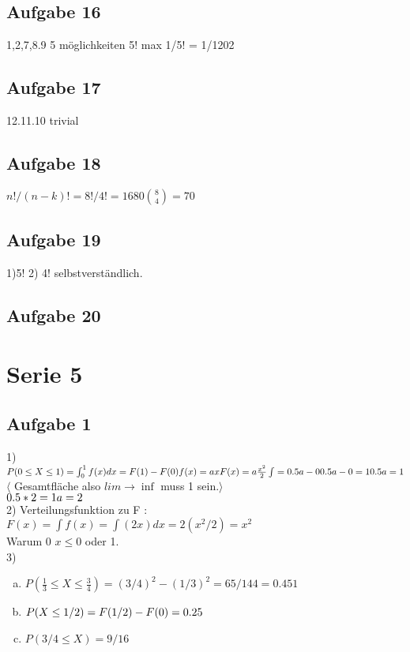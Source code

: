\documentclass[a4paper,10pt]{scrbook}
\begin{document}
\section*{Aufgabe 16} 1,2,7,8.9 5 möglichkeiten 5! max 1/5! = 1/1202
\section*{Aufgabe 17} 12.11.10 trivial
\section*{Aufgabe 18} $n!/(n-k)! = 8!/4! = 1680  {8 \choose 4} = 70$
\section*{Aufgabe 19} 1)5! 2) 4! selbstverständlich.
\section*{Aufgabe 20} 
\chapter*{Serie 5}
\section*{Aufgabe 1}
1) $P(0\leq X \leq 1) = \int_0^1 f(x)dx = F(1)-F(0)\\
f(x) = ax\\
F(x) = a \frac{x^2}{2} \\
\int = 0.5a - 0\\
0.5a -0 = 1 \\
0.5a = 1\\$ $\langle$ Gesamtfläche also $ lim \rightarrow \inf$ muss 1 sein.$\rangle$ \\
$0.5 * 2 = 1\\
a = 2$\\

2) Verteilungsfunktion zu F : \\
$F(x) = \int f(x) = \int (2x) dx = 2(x^2/2) = x^2 $\\
Warum 0 $ x \le 0$  oder 1.\\
3) \begin{enumerate}[a)]
    \item $P(\frac{1}{3} \le X \le \frac{3}{4}) = (3/4)^2 - (1/3)^2 = 65/144 = 0.451$
    \item $P(X \le 1/2) = F(1/2) - F(0) = 0.25\\$
    \item $P(3/4 \le X) = 9/16$ \\ 
   \end{enumerate}
\end{document}
